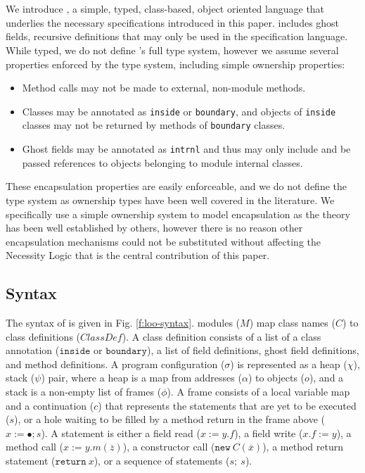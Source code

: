 
\section{\Loo}
\label{app:loo}


We introduce \Loo, a simple, typed, class-based, object oriented language that underlies the necessary specifications
introduced in this paper. \Loo includes ghost fields, recursive definitions that may only be
used in the specification language.
While typed, we do not define \Loo's
full type system, however we assume several properties enforced by the type system, including 
simple ownership properties:
\begin{itemize}
\item
Method calls may not be made to external, non-module methods.
\item
Classes may be annotated as \texttt{inside} or \texttt{boundary}, and objects of \texttt{inside} classes may not be returned by methods of \texttt{boundary} classes.
\item
Ghost fields may be annotated as \texttt{intrnl} and thus may only include and be passed references to objects belonging to module internal classes.
\end{itemize}
These encapsulation properties are easily enforceable, and we
do not define the type system as ownership types have been 
well covered in the literature. 
We specifically use a simple ownership system to model 
encapsulation as the theory has been well established by others, 
however there is no reason other encapsulation mechanisms could 
not be substituted without affecting the Necessity Logic that 
is the central contribution of this paper.

\subsection{Syntax}
The syntax of \Loo is given in Fig. \ref{f:loo-syntax}.
\Loo modules ($M$) map class names ($C$) to class definitions ($\textit{ClassDef}$).
A class definition consists of a list of a class annotation ($\texttt{inside}$ or $\texttt{boundary}$),
a list of field definitions, ghost field definitions, and method definitions.
A program configuration ($\sigma$) is represented as a heap ($\chi$), stack ($\psi$) pair, 
where a heap is a map from addresses ($\alpha$) to objects ($o$), and a stack is a non-empty list of frames ($\phi$). A frame consists of a local variable
map and a continuation ($c$) that represents the statements that are yet to be executed ($s$),
or a hole waiting to be filled by a method return in the frame above ($x := \bullet; s$).
A statement is either a field read ($x := y.f$), a field write ($x.f := y$), a method call
($x := y.m(\overline{z})$), a constructor call ($\texttt{new}\ C(\overline{x})$), a method return statement
($\texttt{return}\ x$), or a sequence of statements ($s;\ s$).

